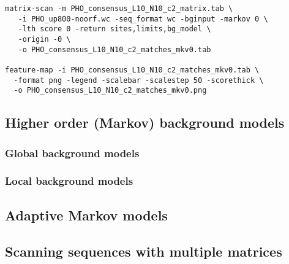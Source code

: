 {\color{Blue} \begin{footnotesize} 
\begin{verbatim}
matrix-scan -m PHO_consensus_L10_N10_c2_matrix.tab \
   -i PHO_up800-noorf.wc -seq_format wc -bginput -markov 0 \
   -lth score 0 -return sites,limits,bg_model \
   -origin -0 \
   -o PHO_consensus_L10_N10_c2_matches_mkv0.tab

feature-map -i PHO_consensus_L10_N10_c2_matches_mkv0.tab \
  -format png -legend -scalebar -scalestep 50 -scorethick \
  -o PHO_consensus_L10_N10_c2_matches_mkv0.png 

\end{verbatim} \end{footnotesize}
}


\subsection{Higher order (Markov) background models}

\subsubsection{Global background models}

\subsubsection{Local background models}

\subsection{Adaptive Markov models}

\subsection{Scanning sequences with multiple matrices}
